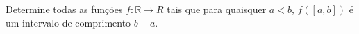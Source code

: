 Determine todas as funções \(f\colon  \mathbb{R}\to{R}\) tais que para quaisquer \(a<b\), \(f([a,b])\) é um intervalo de comprimento \(b-a\).

